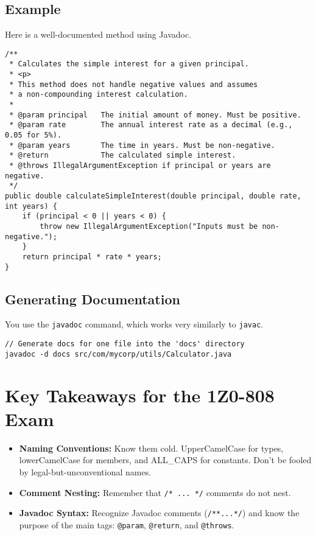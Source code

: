 \documentclass[12pt]{article}
\begin{document}
\begin{enumerate}[label=(\arabic*)]
\subsection{Example}
Here is a well-documented method using Javadoc.
\begin{verbatim}
/**
 * Calculates the simple interest for a given principal.
 * <p>
 * This method does not handle negative values and assumes
 * a non-compounding interest calculation.
 *
 * @param principal   The initial amount of money. Must be positive.
 * @param rate        The annual interest rate as a decimal (e.g., 0.05 for 5%).
 * @param years       The time in years. Must be non-negative.
 * @return            The calculated simple interest.
 * @throws IllegalArgumentException if principal or years are negative.
 */
public double calculateSimpleInterest(double principal, double rate, int years) {
    if (principal < 0 || years < 0) {
        throw new IllegalArgumentException("Inputs must be non-negative.");
    }
    return principal * rate * years;
}
\end{verbatim}

\subsection{Generating Documentation}
You use the \texttt{javadoc} command, which works very similarly to \texttt{javac}.
\begin{verbatim}
// Generate docs for one file into the 'docs' directory
javadoc -d docs src/com/mycorp/utils/Calculator.java
\end{verbatim}

\section{Key Takeaways for the 1Z0-808 Exam}
\begin{itemize}
    \item \textbf{Naming Conventions:} Know them cold. UpperCamelCase for types, lowerCamelCase for members, and ALL_CAPS for constants. Don't be fooled by legal-but-unconventional names.
    \item \textbf{Comment Nesting:} Remember that \texttt{/* ... */} comments do not nest.
    \item \textbf{Javadoc Syntax:} Recognize Javadoc comments (\texttt{/**...*/}) and know the purpose of the main tags: \texttt{@param}, \texttt{@return}, and \texttt{@throws}.
\end{itemize}
\end{enumerate}
\end{document}
